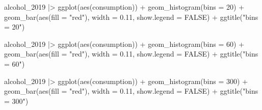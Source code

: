 \documentclass[
  letterpaper,
  DIV=11,
  numbers=noendperiod]{scrreprt}
\newenvironment{Shaded}{\begin{snugshade}}{\end{snugshade}}
\newcommand{\AttributeTok}[1]{\textcolor[rgb]{0.40,0.45,0.13}{#1}}
\newcommand{\ConstantTok}[1]{\textcolor[rgb]{0.56,0.35,0.01}{#1}}
\newcommand{\DecValTok}[1]{\textcolor[rgb]{0.68,0.00,0.00}{#1}}
\newcommand{\FloatTok}[1]{\textcolor[rgb]{0.68,0.00,0.00}{#1}}
\newcommand{\FunctionTok}[1]{\textcolor[rgb]{0.28,0.35,0.67}{#1}}
\newcommand{\NormalTok}[1]{\textcolor[rgb]{0.00,0.23,0.31}{#1}}
\newcommand{\SpecialCharTok}[1]{\textcolor[rgb]{0.37,0.37,0.37}{#1}}
\newcommand{\StringTok}[1]{\textcolor[rgb]{0.13,0.47,0.30}{#1}}
\begin{document}
\begin{Shaded}
\begin{Highlighting}[]
\NormalTok{  alcohol\_2019 }\SpecialCharTok{|\textgreater{}}
  \FunctionTok{ggplot}\NormalTok{(}\FunctionTok{aes}\NormalTok{(consumption)) }\SpecialCharTok{+}
  \FunctionTok{geom\_histogram}\NormalTok{(}\AttributeTok{bins =} \DecValTok{20}\NormalTok{) }\SpecialCharTok{+}
  \FunctionTok{geom\_bar}\NormalTok{(}\FunctionTok{aes}\NormalTok{(}\AttributeTok{fill =} \StringTok{"red"}\NormalTok{), }\AttributeTok{width =} \FloatTok{0.11}\NormalTok{, }\AttributeTok{show.legend =} \ConstantTok{FALSE}\NormalTok{) }\SpecialCharTok{+}
  \FunctionTok{ggtitle}\NormalTok{(}\StringTok{"bins = 20"}\NormalTok{)}
\end{Highlighting}
\end{Shaded}

\begin{Shaded}
\begin{Highlighting}[]
\NormalTok{  alcohol\_2019 }\SpecialCharTok{|\textgreater{}}
  \FunctionTok{ggplot}\NormalTok{(}\FunctionTok{aes}\NormalTok{(consumption)) }\SpecialCharTok{+}
  \FunctionTok{geom\_histogram}\NormalTok{(}\AttributeTok{bins =} \DecValTok{60}\NormalTok{) }\SpecialCharTok{+}
  \FunctionTok{geom\_bar}\NormalTok{(}\FunctionTok{aes}\NormalTok{(}\AttributeTok{fill =} \StringTok{"red"}\NormalTok{), }\AttributeTok{width =} \FloatTok{0.11}\NormalTok{, }\AttributeTok{show.legend =} \ConstantTok{FALSE}\NormalTok{) }\SpecialCharTok{+}
  \FunctionTok{ggtitle}\NormalTok{(}\StringTok{"bins = 60"}\NormalTok{)}
\end{Highlighting}
\end{Shaded}

\begin{Shaded}
\begin{Highlighting}[]
\NormalTok{  alcohol\_2019 }\SpecialCharTok{|\textgreater{}}
  \FunctionTok{ggplot}\NormalTok{(}\FunctionTok{aes}\NormalTok{(consumption)) }\SpecialCharTok{+}
  \FunctionTok{geom\_histogram}\NormalTok{(}\AttributeTok{bins =} \DecValTok{300}\NormalTok{) }\SpecialCharTok{+}
  \FunctionTok{geom\_bar}\NormalTok{(}\FunctionTok{aes}\NormalTok{(}\AttributeTok{fill =} \StringTok{"red"}\NormalTok{), }\AttributeTok{width =} \FloatTok{0.11}\NormalTok{, }\AttributeTok{show.legend =} \ConstantTok{FALSE}\NormalTok{) }\SpecialCharTok{+}
  \FunctionTok{ggtitle}\NormalTok{(}\StringTok{"bins = 300"}\NormalTok{)}
\end{Highlighting}
\end{Shaded}
\end{document}

